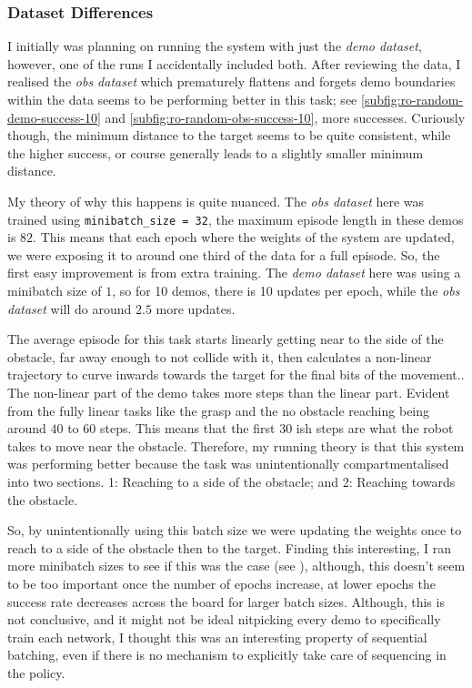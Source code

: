 \subsubsection{Dataset Differences}
I initially was planning on running the system with just the \emph{demo dataset}, however, one of the runs I accidentally included both. After reviewing the data, I realised the \emph{obs dataset} which prematurely flattens and forgets demo boundaries within the data seems to be performing better in this task; see \ref{subfig:ro-random-demo-success-10} and \ref{subfig:ro-random-obs-success-10}, more successes. Curiously though, the minimum distance to the target seems to be quite consistent, while the higher success, or course generally leads to a slightly smaller minimum distance.

My theory of why this happens is quite nuanced.\todo[color=purple]{} The \emph{obs dataset} here was trained using \verb|minibatch_size = 32|, the maximum episode length in these demos is $82$. This means that each epoch where the weights of the system are updated, we were exposing it to around one third of the data for a full episode. So, the first easy improvement is from extra training. The \emph{demo dataset} here was using a minibatch size of $1$, so for 10 demos, there is 10 updates per epoch, while the \emph{obs dataset} will do around $2.5$ more updates. 

The average episode for this task starts linearly getting near to the side of the obstacle, far away enough to not collide with it, then calculates a non-linear trajectory to curve inwards towards the target for the final bits of the movement.. The non-linear part of the demo takes more steps than the linear part. Evident from the fully linear tasks like the grasp and the no obstacle reaching being around $40$ to $60$ steps. This means that the first $30$ ish steps are what the robot takes to move near the obstacle. Therefore, my running theory is that this system was performing better because the task was unintentionally compartmentalised into two sections. 1: Reaching to a side of the obstacle; and 2: Reaching towards the obstacle.

So, by unintentionally using this batch size we were updating the weights once to reach to a side of the obstacle then to the target. Finding this interesting, I ran more minibatch sizes to see if this was the case (see ), although, this doesn't seem to be too important once the number of epochs increase, at lower epochs the success rate decreases across the board for larger batch sizes. Although, this is not conclusive, and it might not be ideal nitpicking every demo to specifically train each network, I thought this was an interesting property of sequential batching, even if there is no mechanism to explicitly take care of sequencing in the policy.


